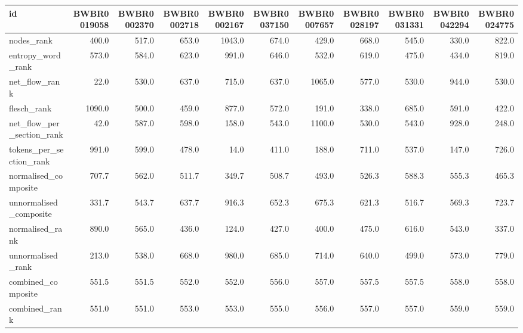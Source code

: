 \begin{tabular}{lrrrrrrrrrr}
\toprule
id & BWBR0019058 & BWBR0002370 & BWBR0002718 & BWBR0002167 & BWBR0037150 & BWBR0007657 & BWBR0028197 & BWBR0031331 & BWBR0042294 & BWBR0024775 \\
\midrule
nodes\_rank & 400.0 & 517.0 & 653.0 & 1043.0 & 674.0 & 429.0 & 668.0 & 545.0 & 330.0 & 822.0 \\
\cline{1-11}
entropy\_word\_rank & 573.0 & 584.0 & 623.0 & 991.0 & 646.0 & 532.0 & 619.0 & 475.0 & 434.0 & 819.0 \\
\cline{1-11}
net\_flow\_rank & 22.0 & 530.0 & 637.0 & 715.0 & 637.0 & 1065.0 & 577.0 & 530.0 & 944.0 & 530.0 \\
\cline{1-11}
flesch\_rank & 1090.0 & 500.0 & 459.0 & 877.0 & 572.0 & 191.0 & 338.0 & 685.0 & 591.0 & 422.0 \\
\cline{1-11}
net\_flow\_per\_section\_rank & 42.0 & 587.0 & 598.0 & 158.0 & 543.0 & 1100.0 & 530.0 & 543.0 & 928.0 & 248.0 \\
\cline{1-11}
tokens\_per\_section\_rank & 991.0 & 599.0 & 478.0 & 14.0 & 411.0 & 188.0 & 711.0 & 537.0 & 147.0 & 726.0 \\
\cline{1-11}
normalised\_composite & 707.7 & 562.0 & 511.7 & 349.7 & 508.7 & 493.0 & 526.3 & 588.3 & 555.3 & 465.3 \\
\cline{1-11}
unnormalised\_composite & 331.7 & 543.7 & 637.7 & 916.3 & 652.3 & 675.3 & 621.3 & 516.7 & 569.3 & 723.7 \\
\cline{1-11}
normalised\_rank & 890.0 & 565.0 & 436.0 & 124.0 & 427.0 & 400.0 & 475.0 & 616.0 & 543.0 & 337.0 \\
\cline{1-11}
unnormalised\_rank & 213.0 & 538.0 & 668.0 & 980.0 & 685.0 & 714.0 & 640.0 & 499.0 & 573.0 & 779.0 \\
\cline{1-11}
combined\_composite & 551.5 & 551.5 & 552.0 & 552.0 & 556.0 & 557.0 & 557.5 & 557.5 & 558.0 & 558.0 \\
\cline{1-11}
combined\_rank & 551.0 & 551.0 & 553.0 & 553.0 & 555.0 & 556.0 & 557.0 & 557.0 & 559.0 & 559.0 \\
\cline{1-11}
\bottomrule
\end{tabular}

